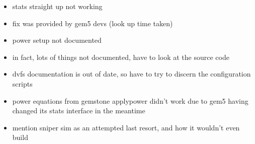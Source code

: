 \begin{itemize}
    \item stats straight up not working
    \item fix was provided by gem5 devs (look up time taken)
    \item power setup not documented
    \item in fact, lots of things not documented, have to look at the source
          code
    \item dvfs documentation is out of date, so have to try to discern the
          configuration scripts
    \item power equations from gemstone applypower didn't work due to gem5
          having changed its stats interface in the meantime
    \item mention sniper sim as an attempted last resort, and how it wouldn't
          even build
\end{itemize}